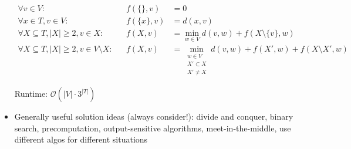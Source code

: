 \begin{itemize}
\begin{align*}
\forall v \in V: &&f(\{\}, v) &= 0 && \\
\forall x \in T, v \in V: &&f(\{x\}, v) &= d(x, v) && \\
\forall X \subseteq T, |X| \geq 2, v \in X: &&f(X, v) &= \min_{w\in V} d(v, w) + f(X \setminus \{v\}, w) && \\
\forall X \subseteq T, |X| \geq 2, v \in V \setminus X: 
      &&f(X, v) &= \min_{\substack{w\in V \\ X' \subset X \\ X' \neq X }} 
            d(v, w) + f(X', w) + f(X \setminus X', w)
\end{align*}

Runtime: $\mathcal{O}(|V| \cdot 3^{|T|})$

\item Generally useful solution ideas (always consider!): divide and conquer, binary search, precomputation, output-sensitive algorithms, meet-in-the-middle, use different algos for different situations

\end{itemize}
